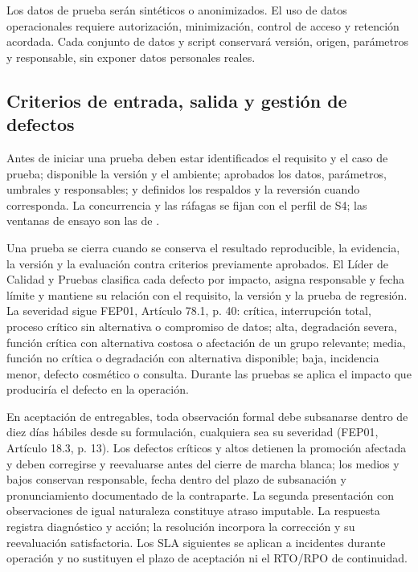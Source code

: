 Los datos de prueba serán sintéticos o anonimizados. El uso de datos operacionales requiere autorización, minimización, control de acceso y retención acordada. Cada conjunto de datos y script conservará versión, origen, parámetros y responsable, sin exponer datos personales reales.

\subsection{Criterios de entrada, salida y gestión de defectos}\label{sec:9-criterios}

Antes de iniciar una prueba deben estar identificados el requisito y el caso de prueba; disponible la versión y el ambiente; aprobados los datos, parámetros, umbrales y responsables; y definidos los respaldos y la reversión cuando corresponda. La concurrencia y las ráfagas se fijan con el perfil de S4; las ventanas de ensayo son las de .

Una prueba se cierra cuando se conserva el resultado reproducible, la evidencia, la versión y la evaluación contra criterios previamente aprobados. El Líder de Calidad y Pruebas clasifica cada defecto por impacto, asigna responsable y fecha límite y mantiene su relación con el requisito, la versión y la prueba de regresión. La severidad sigue FEP01, Artículo 78.1, p. 40: crítica, interrupción total, proceso crítico sin alternativa o compromiso de datos; alta, degradación severa, función crítica con alternativa costosa o afectación de un grupo relevante; media, función no crítica o degradación con alternativa disponible; baja, incidencia menor, defecto cosmético o consulta. Durante las pruebas se aplica el impacto que produciría el defecto en la operación.

En aceptación de entregables, toda observación formal debe subsanarse dentro de diez días hábiles desde su formulación, cualquiera sea su severidad (FEP01, Artículo 18.3, p. 13). Los defectos críticos y altos detienen la promoción afectada y deben corregirse y reevaluarse antes del cierre de marcha blanca; los medios y bajos conservan responsable, fecha dentro del plazo de subsanación y pronunciamiento documentado de la contraparte. La segunda presentación con observaciones de igual naturaleza constituye atraso imputable. La respuesta registra diagnóstico y acción; la resolución incorpora la corrección y su reevaluación satisfactoria. Los SLA siguientes se aplican a incidentes durante operación y no sustituyen el plazo de aceptación ni el RTO/RPO de continuidad.

